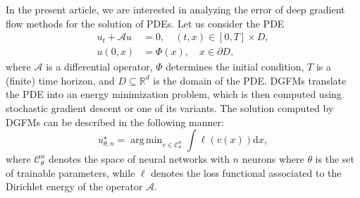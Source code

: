 \documentclass[11pt,a4paper,reqno]{amsart}
\numberwithin{equation}{section}
\theoremstyle{plain}
\theoremstyle{definition}
\DeclareMathOperator*{\argmin}{arg\,min}
\begin{document}
In the present article, we are interested in analyzing the error of deep gradient flow methods for the solution of PDEs.
Let us consider the PDE 
\begin{equation}%
\label{PDE-gen}
    \begin{split}
        u_t + \mathcal Au & = 0, \quad (t,x)\in[0,T]\times D, \\
        u(0,x)              & = \Phi (x), \quad x\in\partial D,
    \end{split}
\end{equation}
where $\mathcal A$ is a differential operator, $\Phi$ determines the initial condition, $T$ is a (finite) time horizon, and $D\subseteq \mathbb R^d$ is the domain of the PDE.    
DGFMs translate the PDE into an energy minimization problem, which is then computed using stochastic gradient descent or one of its variants. 
The solution computed by DGFMs can be described in the following manner:
\begin{equation}%
\label{PDE-MIN}
    u^\star_{\theta, n} = \argmin_{v \in \mathcal{C}^n_{\theta}} \int \ell (v(x)) \mathrm dx,
\end{equation}
where $\mathcal{C}^n_{\theta}$ denotes the space of neural networks with $n$ neurons where $\theta$ is the set of trainable parameters, while $\ell$ denotes the loss functional associated to the Dirichlet energy of the operator $\mathcal{A}$.
\end{document}
